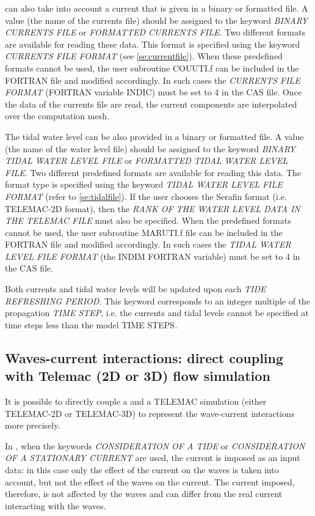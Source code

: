  \tomawac can also take into account a current that is given in a binary or formatted file. A value (the name of the currents file) should be assigned to the keyword \textit{BINARY CURRENTS FILE} or\textit{ FORMATTED CURRENTS FILE}. Two different formats are available for reading these data. This format is specified using the keyword \textit{CURRENTS FILE FORMAT} (see \ref{se:currentfile}). When these predefined formats cannot be used, the user subroutine COUUTI.f can be included in the FORTRAN file and modified accordingly. In such cases the \textit{CURRENTS FILE FORMAT} (FORTRAN variable INDIC) must be set to 4 in the CAS file. Once the data of the currents file are read, the current components are interpolated over the computation mesh.

 The tidal water level can be also provided in a binary or formatted file. A value (the name of the water level file) should be assigned to the keyword \textit{BINARY TIDAL WATER LEVEL FILE} or\textit{ FORMATTED TIDAL WATER LEVEL FILE}. Two different predefined formats are available for reading this data. The format type is specified using the keyword \textit{TIDAL WATER LEVEL FILE FORMAT} (refer to \ref{se:tidalfile}). If the user chooses the Serafin format (i.e. TELEMAC-2D format), then the \textit{RANK OF THE WATER LEVEL DATA IN THE TELEMAC FILE} must also be specified. When the predefined formats cannot be used, the user subroutine MARUTI.f file can be included in the FORTRAN file and modified accordingly. In such cases the \textit{TIDAL WATER LEVEL FILE FORMAT} (the INDIM FORTRAN variable) must be set to 4 in the CAS file.

 Both currents and tidal water levels will be updated upon each \textit{TIDE REFRESHING PERIOD}. This keyword corresponds to an integer multiple of the propagation \textit{TIME STEP}, i.e. the currents and tidal levels cannot be specified at time steps less than the model TIME STEPS\textit{.}


\subsection{ Waves-current interactions: direct coupling with Telemac (2D or 3D) flow simulation}

 It is possible to directly couple a \tomawac and a TELEMAC simulation (either TELEMAC-2D or TELEMAC-3D) to represent the wave-current interactions more precisely.

 In \tomawac, when the keywords \textit{CONSIDERATION OF A TIDE} or \textit{CONSIDERATION OF A STATIONARY CURRENT} are used, the current is imposed as an input data: in this case only the effect of the current on the waves is taken into account, but not the effect of the waves on the current. The current imposed, therefore, is not affected by the waves and can differ from the real current interacting with the waves.

